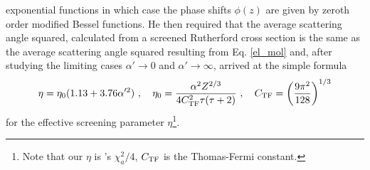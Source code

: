 exponential functions in which case the phase shifts $\phi(z)$ are
given by zeroth order modified Bessel functions. He then required
that the average scattering angle squared, calculated from a
screened Rutherford cross section is the same as the average
scattering angle squared resulting from Eq. \eqref{el_mol} and,
after studying the limiting cases $\alpha' \to 0$ and
$\alpha' \to \infty$, arrived at the simple formula
\begin{equation}
\label{eta_0}
\eta = \eta_0 (1.13 + 3.76 \alpha^{\prime 2} )~, \quad
\eta_0 = {\alpha^2 Z^{2/3} \over 4 C_{\rm TF}^2 \tau (\tau + 2)}~,
\quad C_{\rm TF} = \left( {9 \pi^2 \over 128} \right)^{1/3}
\end{equation}
for the effective screening parameter $\eta$\footnote{Note that our
$\eta$ is \Mol's $\chi_a^2/4$, $C_{\rm TF}$ is the Thomas-Fermi
constant.}.


